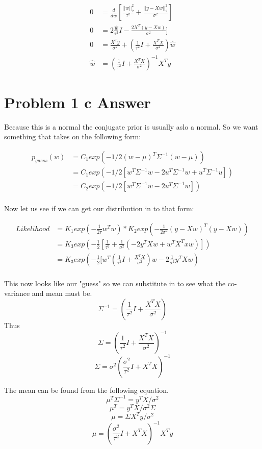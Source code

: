 \documentclass{article}
\newcommand{\1}{\mathbf{1}}
\begin{document}
\begin{align}
    0 & = \frac{d}{d\hat{w}} [  \frac{||w||_2^2}{ \tau^2 } +  \frac{|| y - Xw ||^2_2}{\sigma^2}  ]  \\ 
    0 & = 2 \frac{\hat{w}}{ \tau^2 } I -  \frac{ 2 X^T (y-X w) }{\sigma^2}  ]  \\ 
    0 & = \frac{X^Ty}{\sigma^2} + (\frac{1}{\tau^2} I + \frac{X^TX}{\sigma^2}) \hat{w} \\
    \hat{w} & = (\frac{1}{\tau^2} I + \frac{X^TX}{\sigma^2})^{-1} X^T y
\end{align}


\section*{Problem 1 c Answer}
Because this is a normal the conjugate prior is usually aslo a normal. So we want something that takes on the following form:

\begin{align}
    p_{guess}(w) & = C_1 exp(-1/2 (w-\mu)^T \Sigma^{-1} (w - \mu )) \\
    & = C_1 exp( -1/2 [ w^T \Sigma^{-1} w - 2 u^T\Sigma^{-1} w + u^T\Sigma^{-1} u ]) \\
    & = C_2 exp( -1/2 [ w^T \Sigma^{-1} w - 2 u^T\Sigma^{-1} w ]) \\
\end{align}

Now let us see if we can get our distribution in to that form:


\begin{align}
    Likelihood & = K_1 exp( -\frac{1}{2\tau} w^Tw ) * K_2 exp(-\frac{1}{2\sigma^2} (y-Xw)^T(y-Xw) ) \\ 
    & = K_3 exp(-\frac{1}{2} [ \frac{1}{\tau^2} + \frac{1}{\sigma^2} (-2y^TXw + w^TX^Txw) ]) \\
    & = K_3 exp(-\frac{1}{2} [ w^T ( \frac{1}{\tau^2} I   +\frac{ X^TX}{\sigma^2} ) w  - 2 \frac{1}{\sigma^2} y^T X w) \\
\end{align}

This now looks like our "guess" so we can substitute in to see what the co-variance and mean must be. 
$$\Sigma^{-1} = ( \frac{1}{\tau^2} I + \frac{X^TX}{\sigma^2} )$$
Thus 
$$\Sigma = ( \frac{1}{\tau^2} I + \frac{X^TX}{\sigma^2} )^{-1} $$
$$\Sigma = \sigma^2 ( \frac{\sigma^2}{\tau^2} I +X^T X )^{-1} $$

The mean can be found from the following equation. 
$$ \mu^T \Sigma^{-1} = y^TX/\sigma^2 $$
$$ \mu^T = y^TX/\sigma^2 \Sigma  $$
$$ \mu  =  \Sigma  X^T y /\sigma^2 $$
$$ \mu  =   ( \frac{\sigma^2}{\tau^2} I +X^T X )^{-1}  X^T y  $$
\end{document}
